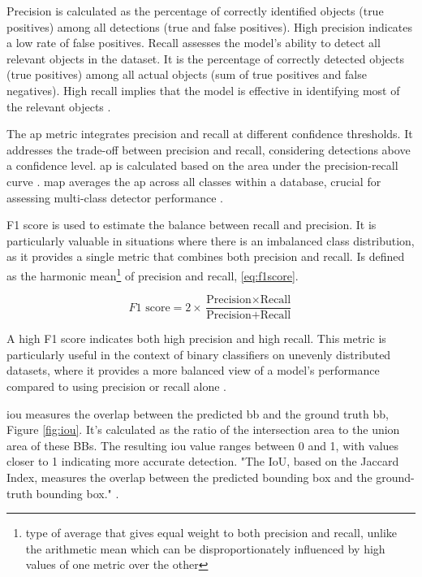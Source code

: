 Precision is calculated as the percentage of correctly identified objects (true positives) among all detections (true and false positives). High precision indicates a low rate of false positives. Recall assesses the model's ability to detect all relevant objects in the dataset. It is the percentage of correctly detected objects (true positives) among all actual objects (sum of true positives and false negatives). High recall implies that the model is effective in identifying most of the relevant objects \cite{rfc25}.

The \ac{ap} metric integrates precision and recall at different confidence thresholds. It addresses the trade-off between precision and recall, considering detections above a confidence level. \ac{ap} is calculated based on the area under the precision-recall curve \cite{rfc25}. \ac{map} averages the \ac{ap} across all classes within a database, crucial for assessing multi-class detector performance \cite{rfc24}. 

F1 score is used to estimate the balance between recall and precision. It is particularly valuable in situations where there is an imbalanced class distribution, as it provides a single metric that combines both precision and recall. Is defined as the harmonic mean\footnote{type of average that gives equal weight to both precision and recall, unlike the arithmetic mean which can be disproportionately influenced by high values of one metric over the other} of precision and recall, \ref{eq:f1score}. 

\begin{equation}
    F1 \text{ score} = 2 \times \frac{\text{Precision} \times \text{Recall}}{\text{Precision} + \text{Recall}}
    \label{eq:f1score}
\end{equation}
    
A high F1 score indicates both high precision and high recall. This metric is particularly useful in the context of binary classifiers on unevenly distributed datasets, where it provides a more balanced view of a model's performance compared to using precision or recall alone \cite{rfc9}.

\ac{iou} measures the overlap between the predicted \ac{bb} and the ground truth \ac{bb}, Figure \ref{fig:iou}. It's calculated as the ratio of the intersection area to the union area of these BBs. The resulting \ac{iou} value ranges between 0 and 1, with values closer to 1 indicating more accurate detection. "The IoU, based on the Jaccard Index, measures the overlap between the predicted bounding box and the ground-truth bounding box." \cite{rfc24}.

